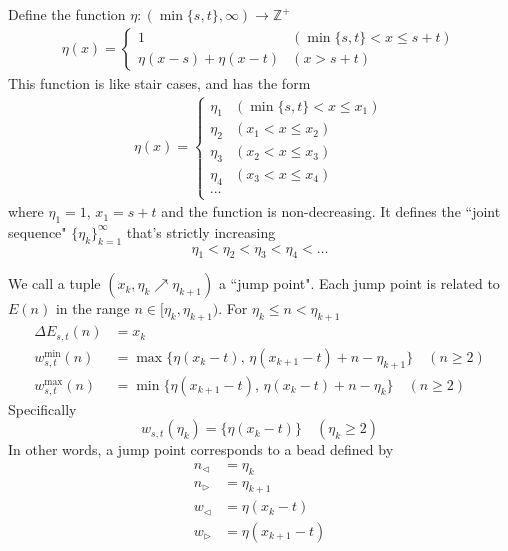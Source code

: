 \documentclass[]{article}
\begin{document}
\vspace{1cm}
\begin{lemma}[Joint]
	Define the function $\eta : (\min\{s, t\}, \infty) \to \mathbb{Z}^+$
	\begin{align*}
	\eta(x) = \begin{cases} 1  &(\min\{s, t\}<x\le s+t)\\
	 \eta(x-s) + \eta(x-t)  &(x> s+t)
	\end{cases}
	\end{align*}
	This function is like stair cases, and has the form
	\begin{align*}
	\eta(x) = \begin{cases} \eta_1  &(\min\{s, t\}<x\le x_1)\\
	\eta_2  &(x_1<x\le x_2)\\
	\eta_3  &(x_2<x\le x_3)\\
	\eta_4  &(x_3<x\le x_4)\\
	\cdots
	\end{cases}
	\end{align*}
	where $\eta_1 = 1$,  $x_1 = s+t$ and the function is non-decreasing. It defines the ``joint sequence" $\{\eta_k\}_{k=1}^{\infty}$ that's strictly increasing
	\[
	\eta_1 < \eta_2 < \eta_3 < \eta_4 < \dots
	\]
	
	We call a tuple $(x_k, \eta_k\nearrow\eta_{k+1})$ a ``jump point". Each jump point is related to $E(n)$ in the range $n \in [\eta_k, \eta_{k+1})$. For $\eta_k \le n < \eta_{k+1}$
	\begin{align*}
	\Delta E_{s,t}(n) &= x_k\\
	w^{\min}_{s,t}(n) &= \max\{\eta(x_k-t),\, \eta(x_{k+1}-t) + n -\eta_{k+1}\}\quad(n\geq 2)	\\
	w^{\max}_{s,t}(n) &= \min\{\eta(x_{k+1}-t),\,\eta(x_k-t) + n -\eta_k \} \quad(n\geq 2)
	\end{align*}
	Specifically
	\[
	w_{s,t}(\eta_k) = \{\eta(x_k-t)\}\quad(\eta_k\geq 2)
	\]
	In other words, a jump point corresponds to a bead defined by
	\begin{align*}
	n_{\triangleleft} &= \eta_k\\
	n_{\triangleright} &= \eta_{k+1}\\
	w_{\triangleleft} &= \eta(x_k - t)\\
	w_{\triangleright} &= \eta(x_{k+1} - t)
	\end{align*}
\end{lemma}
\end{document}
